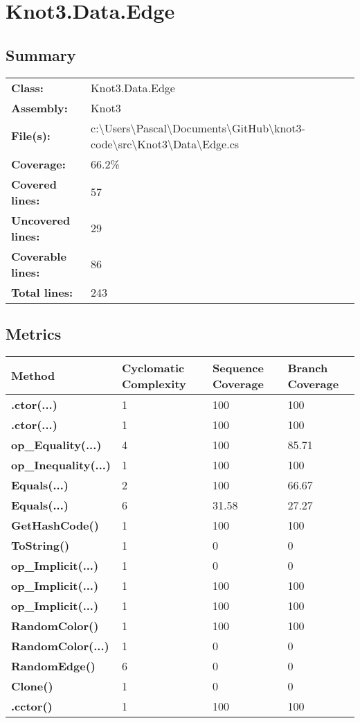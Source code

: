 \documentclass[a4paper,10pt]{article}
\begin{document}
\section{Knot3.Data.Edge}
\subsection{Summary}
\begin{longtable}[l]{ll}
\textbf{Class:} & Knot3.Data.Edge\\
\textbf{Assembly:} & Knot3\\
\textbf{File(s):} & \begin{minipage}[t]{12cm}{c:\textbackslash Users\textbackslash Pascal\textbackslash Documents\textbackslash GitHub\textbackslash knot3-code\textbackslash src\textbackslash Knot3\textbackslash Data\textbackslash Edge.cs}\end{minipage} \\
\textbf{Coverage:} & 66.2\%\\
\textbf{Covered lines:} & 57\\
\textbf{Uncovered lines:} & 29\\
\textbf{Coverable lines:} & 86\\
\textbf{Total lines:} & 243\\
\end{longtable}
\subsection{Metrics}
\begin{longtable}[l]{|l|l|l|l|}
\hline
\textbf{Method} & \textbf{Cyclomatic Complexity} & \textbf{Sequence Coverage} & \textbf{Branch Coverage}\\
\hline
\textbf{.ctor(...)} & 1 & 100 & 100\\
\hline
\textbf{.ctor(...)} & 1 & 100 & 100\\
\hline
\textbf{op\_Equality(...)} & 4 & 100 & 85.71\\
\hline
\textbf{op\_Inequality(...)} & 1 & 100 & 100\\
\hline
\textbf{Equals(...)} & 2 & 100 & 66.67\\
\hline
\textbf{Equals(...)} & 6 & 31.58 & 27.27\\
\hline
\textbf{GetHashCode()} & 1 & 100 & 100\\
\hline
\textbf{ToString()} & 1 & 0 & 0\\
\hline
\textbf{op\_Implicit(...)} & 1 & 0 & 0\\
\hline
\textbf{op\_Implicit(...)} & 1 & 100 & 100\\
\hline
\textbf{op\_Implicit(...)} & 1 & 100 & 100\\
\hline
\textbf{RandomColor()} & 1 & 100 & 100\\
\hline
\textbf{RandomColor(...)} & 1 & 0 & 0\\
\hline
\textbf{RandomEdge()} & 6 & 0 & 0\\
\hline
\textbf{Clone()} & 1 & 0 & 0\\
\hline
\textbf{.cctor()} & 1 & 100 & 100\\
\hline
\end{longtable}
\end{document}
